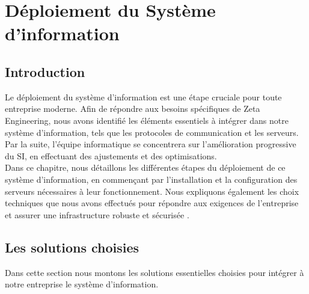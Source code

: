 \chapter{Déploiement du Système d'information}


\section{Introduction}


Le déploiement du système d'information est une étape cruciale pour toute entreprise moderne. Afin de répondre aux besoins spécifiques de Zeta Engineering, nous avons identifié les éléments essentiels à intégrer dans notre système d'information, tels que les protocoles de communication et les serveurs. Par la suite, l'équipe informatique se concentrera sur l'amélioration progressive du SI, en effectuant des ajustements et des optimisations. \\


Dans ce chapitre, nous détaillons les différentes étapes du déploiement de ce système d'information, en commençant par l'installation et la configuration des serveurs nécessaires à leur fonctionnement. Nous expliquons également les choix techniques que nous avons effectués pour répondre aux exigences de l'entreprise et assurer une infrastructure robuste et sécurisée \cite{opg}. \\


\section{Les solutions choisies}

Dans cette section nous montons les solutions essentielles choisies pour intégrer à notre entreprise le système d'information.

